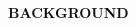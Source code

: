 \documentclass[12pt]{report}
\renewcommand{\_}{\kern-1.5pt\textunderscore\kern-1.5pt}
\begin{document}
\vspace{\baselineskip}

\vspace{\baselineskip}
\begin{adjustwidth}{3.7in}{0.84in}
\begin{justify}
{\fontsize{24pt}{28.8pt}\selectfont \textbf{\textcolor[HTML]{0D0D0D}{BACKGROUND}}\par}
\end{justify}\par

\end{adjustwidth}


\vspace{\baselineskip}

\vspace{\baselineskip}
\vspace{\baselineskip}

\vspace{\baselineskip}
\end{document}
